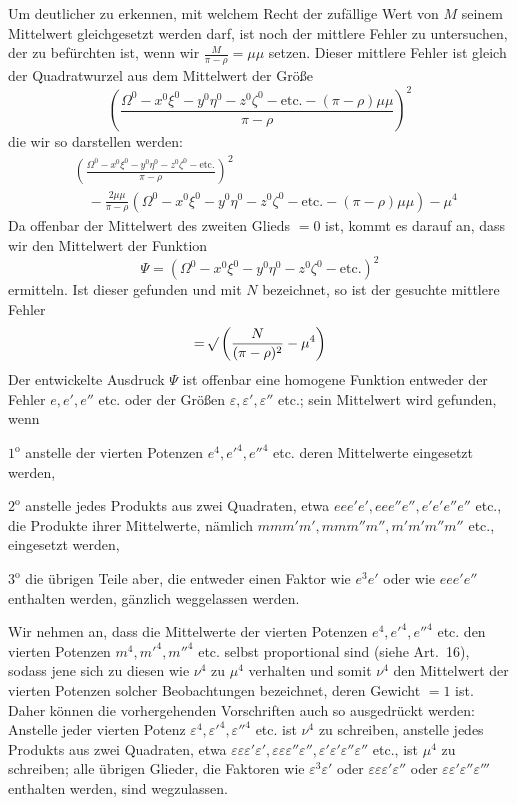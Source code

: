 Um deutlicher zu erkennen, mit welchem Recht der zufällige Wert von \(M\) seinem Mittelwert gleichgesetzt werden darf, ist noch der mittlere Fehler zu untersuchen, der zu befürchten ist, wenn wir \(\frac{M}{\pi-\rho}=\mu\mu\) setzen. Dieser mittlere Fehler ist gleich der Quadratwurzel aus dem Mittelwert der Größe
\[
\left(\frac{\Omega^0-x^0\xi^0-y^0\eta^0-z^0\zeta^0-\text{etc.}-(\pi-\rho)\mu\mu}{\pi-\rho}\right)^2
\]
die wir so darstellen werden:
\[
\begin{aligned}
&\left(\frac{\Omega^0-x^0\xi^0-y^0\eta^0-z^0\zeta^0-\text{etc.}}{\pi-\rho}\right)^2\\[4pt]
&\quad-\frac{2\mu\mu}{\pi-\rho}(\Omega^0-x^0\xi^0-y^0\eta^0-z^0\zeta^0-\text{etc.}-(\pi-\rho)\mu\mu)-\mu^4
\end{aligned}
\]
Da offenbar der Mittelwert des zweiten Glieds \(=0\) ist, kommt es darauf an, dass wir den Mittelwert der Funktion
\[
\Psi=(\Omega^0-x^0\xi^0-y^0\eta^0-z^0\zeta^0-\text{etc.})^2
\]
ermitteln. Ist dieser gefunden und mit \(N\) bezeichnet, so ist der gesuchte mittlere Fehler
\[
=\mathord{{}^{}\!\surd}\left(\frac{N}{(\pi-\rho)^2}-\mu^4\right)
\]
Der entwickelte Ausdruck \(\Psi\) ist offenbar eine homogene Funktion entweder der Fehler \(e,e',e''\) etc. oder der Größen \(\varepsilon,\varepsilon',\varepsilon''\) etc.; sein Mittelwert wird gefunden, wenn

\(1^\mathrm{o}\) anstelle der vierten Potenzen \(e^4,e'^4,e''^4\) etc. deren Mittelwerte eingesetzt werden,

\(2^\mathrm{o}\) anstelle jedes Produkts aus zwei Quadraten, etwa \(eee'e',\allowbreak eee''e'',\allowbreak e'e'e''e''\) etc., die Produkte ihrer Mittelwerte, nämlich \(mmm'm',\allowbreak mmm''m'',\allowbreak m'm'm''m''\) etc., eingesetzt werden,
\par{}%
\(3^\mathrm{o}\) die übrigen Teile aber, die entweder einen Faktor wie \(e^3e'\) oder wie \(eee'e''\) enthalten werden, gänzlich weggelassen werden.

Wir nehmen an, dass die Mittelwerte der vierten Potenzen \(e^4,\allowbreak e'^4,\allowbreak e''^4\) etc. den vierten Potenzen \(m^4,\allowbreak m'^4,\allowbreak m''^4\) etc. selbst proportional sind (siehe Art.\ 16), sodass jene sich zu diesen wie \(\nu^4\) zu \(\mu^4\) verhalten und somit \(\nu^4\) den Mittelwert der vierten Potenzen solcher Beobachtungen bezeichnet, deren Gewicht \(=1\) ist. Daher können die vorhergehenden Vorschriften auch so ausgedrückt werden: Anstelle jeder vierten Potenz \(\varepsilon^4,\varepsilon'^4,\varepsilon''^4\) etc. ist \(\nu^4\) zu schreiben, anstelle jedes Produkts aus zwei Quadraten, etwa \(\varepsilon\varepsilon\varepsilon'\varepsilon',\allowbreak\varepsilon\varepsilon\varepsilon''\varepsilon'',\allowbreak\varepsilon'\varepsilon'\varepsilon''\varepsilon''\) etc., ist \(\mu^4\) zu schreiben; alle übrigen Glieder, die Faktoren wie \(\varepsilon^3\varepsilon'\) oder \(\varepsilon\varepsilon\varepsilon'\varepsilon''\) oder \(\varepsilon\varepsilon'\varepsilon''\varepsilon'''\) enthalten werden, sind wegzulassen.

